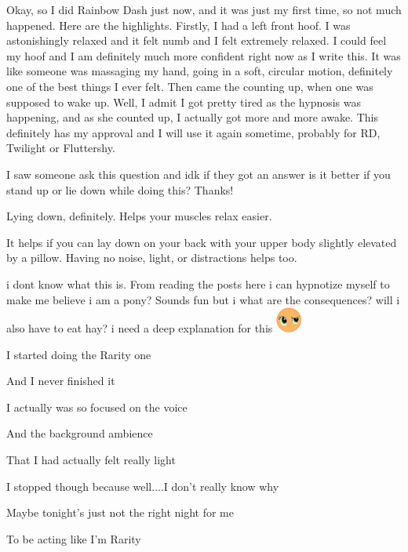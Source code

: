 \documentclass[ebook,12pt,oneside,openany]{memoir}
\begin{document}
\begin{tcolorbox}[title=Opalicious,colback=violet!5!white,colframe=violet!75!black,coltitle=white]
\par{Okay, so I did Rainbow Dash just now, and it was just my first time, so not much happened. Here are the highlights. Firstly, I had a left front hoof. I was astonishingly relaxed and it felt numb and I felt extremely relaxed. I could feel my hoof and I am definitely much more confident right now as I write this. It was like someone was massaging my hand, going in a soft, circular motion, definitely one of the best things I ever felt. Then came the counting up, when one was supposed to wake up. Well, I admit I got pretty tired as the hypnosis was happening, and as she counted up, I actually got more and more awake. This definitely has my approval and I will use it again sometime, probably for RD, Twilight or Fluttershy.}
\end{tcolorbox}
\begin{tcolorbox}[title=Chigens and Kay,colback=olive!5!white,colframe=olive!75!black,coltitle=white]
\begin{tcolorbox}[title=pokesonicfan11]
\par{I saw someone ask this question and idk if they got an answer is it better if you stand up or lie down while doing this? Thanks!}
\end{tcolorbox}
\par{Lying down, definitely. Helps your muscles relax easier.}
\newline{}
\par{It helps if you can lay down on your back with your upper body slightly elevated by a pillow. Having no noise, light, or distractions helps too.}
\end{tcolorbox}
\begin{tcolorbox}[title=Rainbow Dash]
\par{i dont know what this is. From reading the posts here i can hypnotize myself to make me believe i am a pony? Sounds fun but i what are the consequences? will i also have to eat hay? i need a deep explanation for this \includegraphics{images/mlp_huh.png}}
\end{tcolorbox}
\begin{tcolorbox}[title=Moog the Kvlt]
\par{I started doing the Rarity one}
\par{And I never finished it}
\par{I actually was so focused on the voice}
\par{And the background ambience}
\par{That I had actually felt really light}
\par{I stopped though because well....I don't really know why}
\par{Maybe tonight's just not the right night for me}
\par{To be acting like I'm Rarity}
\end{tcolorbox}
\end{document}
